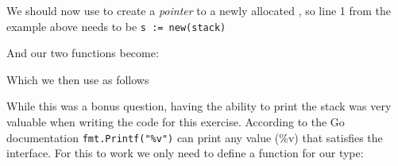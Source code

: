 \begin{Answer}
We should now use  to create a \emph{pointer} to a newly
allocated , so line 1 from the example above needs to be
\lstinline{s := new(stack)}

\noindent{}And our two functions become:

Which we then use as follows


\Question While this was a bonus question, having the ability to print
the stack was very valuable when writing the code for this exercise.
According to the Go documentation \lstinline{fmt.Printf("%v")} can
print any value (\%v) that satisfies the  interface.
For this to work we only need to define a  function for
our type:

\end{Answer}
